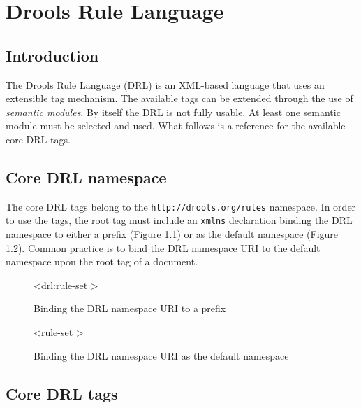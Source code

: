 \chapter{Drools Rule Language}

\section{Introduction}

The Drools Rule Language (DRL) is an XML-based
language that uses an extensible tag mechanism.  The available tags
can be extended through the use of \emph{semantic modules}.
By itself the DRL is not fully usable.  At least one semantic module
must be selected and used.  What follows is a reference for the
available core DRL tags.

\section{Core DRL namespace}

The core DRL tags belong to the \verb|http://drools.org/rules|
namespace.  In order to use the tags, the root tag must include
an \verb|xmlns| declaration binding the DRL namespace to either
a prefix (Figure \ref{drl.namespace.prefix}) or as the default namespace
(Figure \ref{drl.namespace.default}).  Common practice is to bind the
DRL namespace URI to the default namespace upon the root
 tag of a document.

\begin{figure}[hb]
\begin{tagExample}
<drl:rule-set \color{black}{xmlns:drl="http://drools.org/rules"}>
\end{tagExample}
\caption{Binding the DRL namespace URI to a prefix}
\label{drl.namespace.prefix}
\end{figure}

\begin{figure}[hb]
\begin{tagExample}
<rule-set \color{black}{xmlns="http://drools.org/rules"}>
\end{tagExample}
\caption{Binding the DRL namespace URI as the default namespace}
\label{drl.namespace.default}
\end{figure}

\section{Core DRL tags}

